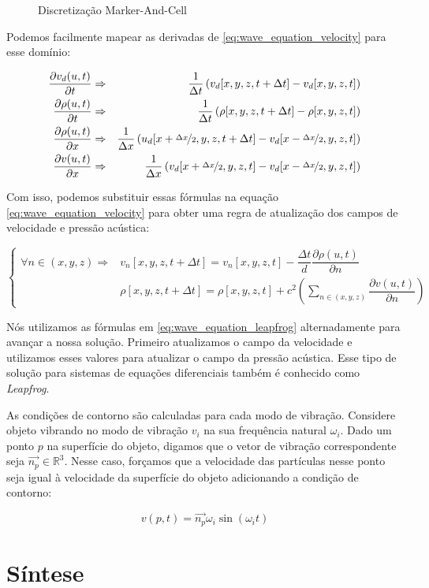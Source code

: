 \begin{figure}[ht]
\centering

\caption[Discretização Marker-And-Cell]{Discretização Marker-And-Cell}
\label{fig:macgrid}
\end{figure}

Podemos facilmente mapear as derivadas de \eqref{eq:wave_equation_velocity} para esse domínio:

\begin{eqnarray*}
	\frac{\partial v_{d}(u, t)}{\partial t} &\Rightarrow& \frac{1}{\Delta t}\left( v_{d}[x, y, z, t + \Delta t] - v_{d}[x, y, z, t]\right)\\
	\frac{\partial \rho(u, t)}{\partial t} &\Rightarrow& \frac{1}{\Delta t}\left( \rho[x, y, z, t + \Delta t] - \rho[x, y, z, t]\right) \\
	\frac{\partial \rho(u, t)}{\partial x} &\Rightarrow& \frac{1}{\Delta x}\left( u_{d}[x + \nicefrac{\Delta x}{2}, y, z, t + \Delta t] - v_{d}[x-\nicefrac{\Delta x}{2}, y, z, t]\right)\\
	\frac{\partial v(u, t)}{\partial x} &\Rightarrow& \frac{1}{\Delta x}\left( v_{d}[x+\nicefrac{\Delta x}{2}, y, z, t] - v_{d}[x-\nicefrac{\Delta x}{2}, y, z, t]\right)
\end{eqnarray*}

Com isso, podemos substituir essas fórmulas na equação \eqref{eq:wave_equation_velocity} para obter uma regra de atualização dos campos de velocidade e pressão acústica:

\begin{equation} \label{eq:wave_equation_leapfrog}
	\begin{cases}
		\forall n \in (x, y, z) \Rightarrow& v_{n}[x, y, z, t+\Delta t] = v_{n}[x, y, z, t] - \dfrac{\Delta t}{d}\dfrac{\partial \rho(u, t)}{\partial n}\\
		&\rho[x, y, z, t+\Delta t] = \rho[x, y, z, t] + c^2 \left( \sum_{n \in (x, y, z)} \dfrac{\partial v(u, t)}{\partial n} \right)
	\end{cases}
\end{equation}

Nós utilizamos as fórmulas em \eqref{eq:wave_equation_leapfrog} alternadamente para avançar a nossa solução. Primeiro atualizamos o campo da velocidade e utilizamos esses valores para atualizar o campo da pressão acústica. Esse tipo de solução para sistemas de equações diferenciais também é conhecido como \emph{Leapfrog}.

As condições de contorno são calculadas para cada modo de vibração. Considere objeto vibrando no modo de vibração $v_i$ na sua frequência natural $\omega_i$. Dado um ponto $p$ na superfície do objeto, digamos que o vetor de vibração correspondente seja $\vec{n_p} \in \mathbb{R}^3$. Nesse caso, forçamos que a velocidade das partículas nesse ponto seja igual à velocidade da superfície do objeto adicionando a condição de contorno:

\begin{equation}
	v(p, t) = \vec{n_p}\omega_i\sin(\omega_it) 
\end{equation}



\section {Síntese}
